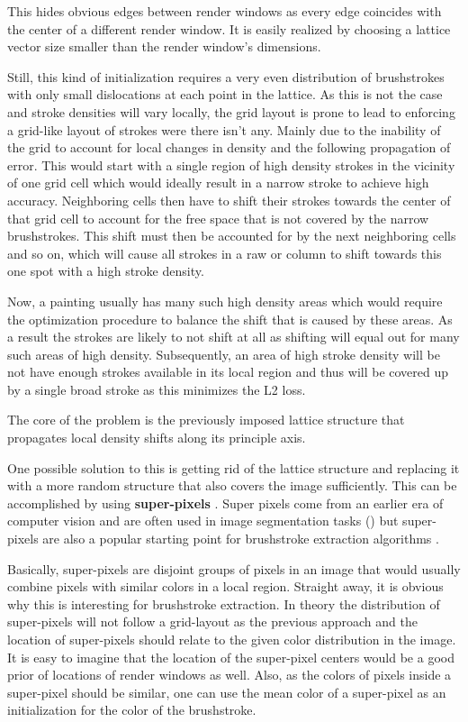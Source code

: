 This hides obvious edges between render windows as every edge coincides with the center of a different render window.
It is easily realized by choosing a lattice vector size smaller than the render window's dimensions.

Still, this kind of initialization requires a very even distribution of brushstrokes with only small dislocations at each point in the lattice.
As this is not the case and stroke densities will vary locally, the grid layout is prone to lead to enforcing a grid-like layout of strokes were there isn't any.
Mainly due to the inability of the grid to account for local changes in density and the following propagation of error.
This would start with a single region of high density strokes in the vicinity of one grid cell which would ideally result in a narrow stroke to achieve high accuracy.
Neighboring cells then have to shift their strokes towards the center of that grid cell to account for the free space that is not covered by the narrow brushstrokes.
This shift must then be accounted for by the next neighboring cells and so on, which will cause all strokes in a raw or column to shift towards this one spot with a high stroke density.

Now, a painting usually has many such high density areas which would require the optimization procedure to balance the shift that is caused by these areas.
As a result the strokes are likely to not shift at all as shifting will equal out for many such areas of high density.
Subsequently, an area of high stroke density will be not have enough strokes available in its local region and thus will be covered up by a single broad stroke as this minimizes the L2 loss.

The core of the problem is the previously imposed lattice structure that propagates local density shifts along its principle axis.

One possible solution to this is getting rid of the lattice structure and replacing it with a more random structure that also covers the image sufficiently.
This can be accomplished by using \textbf{super-pixels} \cite{superpixels}.
Super pixels come from an earlier era of computer vision and are often used in image segmentation tasks (\cite{img segmentation with SP}) but super-pixels are also a popular starting point for brushstroke extraction algorithms \cite{brushs stroke extraction}.

Basically, super-pixels are disjoint groups of pixels in an image that would usually combine pixels with similar colors in a local region.
Straight away, it is obvious why this is interesting for brushstroke extraction.
In theory the distribution of super-pixels will not follow a grid-layout as the previous approach and the location of super-pixels should relate to the given color distribution in the image.
It is easy to imagine that the location of the super-pixel centers would be a good prior of locations of render windows as well.
Also, as the colors of pixels inside a super-pixel should be similar, one can use the mean color of a super-pixel as an initialization for the color of the brushstroke.

